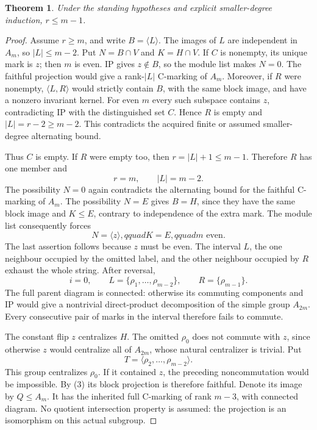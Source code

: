 \documentclass[11pt,a4paper]{article}
\newtheorem{theorem}[lemma]{Theorem}
\newcommand{\gen}[1]{\langle#1\rangle}
\begin{document}
\begin{theorem}
Under the standing hypotheses and explicit smaller-degree
induction, $r\le m-1$.
\end{theorem}
\begin{proof}
Assume $r\ge m$, and write $B=\gen L$.
The images of $L$ are independent in $A_m$, so
$|L|\le m-2$. Put $N=B\cap V$ and $K=H\cap V$.
If $C$ is nonempty, its unique mark is $z$; then $m$
is even. IP gives $z\notin B$, so the module list makes
$N=0$. The faithful projection would give a rank-$|L|$
C-marking of $A_m$. Moreover, if $R$ were nonempty,
$\gen{L,R}$ would strictly contain $B$, with the same
block image, and have a nonzero invariant kernel. For even
$m$ every such subspace contains $z$, contradicting IP
with the distinguished set $C$. Hence $R$ is empty and
$|L|=r-2\ge m-2$. This contradicts the acquired finite
or assumed smaller-degree alternating bound.

Thus $C$ is empty. If $R$ were empty too, then
$r=|L|+1\le m-1$. Therefore $R$ has one member and
\[
                   r=m,\qquad |L|=m-2.               \tag{2}
\]
The possibility $N=0$ again contradicts the alternating
bound for the faithful C-marking of $A_m$. The possibility
$N=E$ gives $B=H$, since they have the same block image
and $K\le E$, contrary to independence of the extra mark.
The module list consequently forces
\[
             N=\gen z,qquad K=E,qquad m\text{ even}.
                                                               \tag{3}
\]
The last assertion follows because $z$ must be even.
The interval $L$, the one neighbour occupied by the omitted
label, and the other neighbour occupied by $R$ exhaust the
whole string. After reversal,
\[
 i=0,\qquad L=\{\rho_1,\ldots,\rho_{m-2}\},
 \qquad R=\{\rho_{m-1}\}.
\]
The full parent diagram is connected: otherwise its commuting
components and IP would give a nontrivial direct-product
decomposition of the simple group $A_{2m}$. Every consecutive
pair of marks in the interval therefore fails to commute.

The constant flip $z$ centralizes $H$. The omitted $\rho_0$
does not commute with $z$, since otherwise $z$ would
centralize all of $A_{2m}$, whose natural centralizer is
trivial. Put
\[
                  T=\gen{\rho_2,\ldots,\rho_{m-2}}.
\]
This group centralizes $\rho_0$. If it contained $z$, the
preceding noncommutation would be impossible. By (3) its
block projection is therefore faithful. Denote its image
by $Q\le A_m$. It has the inherited full C-marking of rank
$m-3$, with connected diagram. No quotient intersection
property is assumed: the projection is an isomorphism on
this actual subgroup.


\end{proof}
\end{document}
